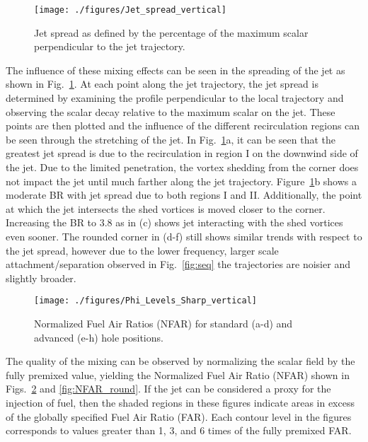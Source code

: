 \documentclass[10pt, twocolumn]{article}
\begin{document}
\begin{figure}[t!]
	\centering
	\texttt{[image: ./figures/Jet\_spread\_vertical]}
	\caption{Jet spread as defined by the percentage of the maximum scalar perpendicular to the jet trajectory.}
	\label{fig:spread}
\end{figure}

The influence of these mixing effects can be seen in the spreading of the jet as shown in Fig.~\ref{fig:spread}. At each point along the jet trajectory, the jet spread is determined by examining the profile perpendicular to the local trajectory and observing the scalar decay relative to the maximum scalar on the jet. These points are then plotted and the influence of the different recirculation regions can be seen through the stretching of the jet. In Fig.~\ref{fig:spread}a, it can be seen that the greatest jet spread is due to the recirculation in region I on the downwind side of the jet. Due to the limited penetration, the vortex shedding from the corner does not impact the jet until much farther along the jet trajectory. Figure~\ref{fig:spread}b shows a moderate BR with jet spread due to both regions I and II. Additionally, the point at which the jet intersects the shed vortices is moved closer to the corner. Increasing the BR to 3.8 as in (c) shows jet interacting with the shed vortices even sooner. The rounded corner in (d-f) still shows similar trends with respect to the jet spread, however due to the lower frequency, larger scale attachment/separation observed in Fig.~\ref{fig:seq} the trajectories are noisier and slightly broader.

\begin{figure}[b!]
	\centering
	\texttt{[image: ./figures/Phi\_Levels\_Sharp\_vertical]}
	\caption{Normalized Fuel Air Ratios (NFAR) for standard (a-d) and advanced (e-h) hole positions.}
	\label{fig:NFAR_sharp}
\end{figure}

The quality of the mixing can be observed by normalizing the scalar field by the fully premixed value, yielding the Normalized Fuel Air Ratio (NFAR) shown in Figs.~\ref{fig:NFAR_sharp} and \ref{fig:NFAR_round}. If the jet can be considered a proxy for the injection of fuel, then the shaded regions in these figures indicate areas in excess of the globally specified Fuel Air Ratio (FAR). Each contour level in the figures corresponds to values greater than 1, 3, and 6 times of the fully premixed FAR.
\end{document}
